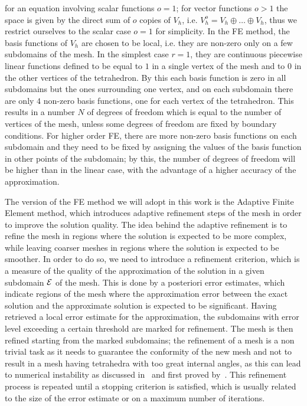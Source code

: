 for an equation involving scalar functions $o=1$; for vector functions $o>1$ the space is given by the direct sum of $o$ copies of $V_h$, i.e. $V_h^o = V_h \oplus \dots \oplus V_h$, thus we restrict ourselves to the scalar case $o=1$ for simplicity. \newline
In the FE method, the basis functions of $V_h$ are chosen to be local, i.e. they are non-zero only on a few subdomains of the mesh.
In the simplest case $r=1$, they are continuous piecewise linear functions defined to be equal to $1$ in a single vertex of the mesh and to $0$ in the other vertices of the tetrahedron. 
By this each basis function is zero in all subdomains but the ones surrounding one vertex, and on each subdomain there are only $4$ non-zero basis functions, one for each vertex of the tetrahedron.
This results in a number $N$ of degrees of freedom which is equal to the number of vertices of the mesh, unless some degrees of freedom are fixed by boundary conditions.
For higher order FE, there are more non-zero basis functions on each subdomain and they need to be fixed by assigning the values of the basis function in other points of the subdomain; by this, the number of degrees of freedom will be higher than in the linear case, with the advantage of a higher accuracy of the approximation. \medskip

The version of the FE method we will adopt in this work is the Adaptive Finite Element method, which introduces adaptive refinement steps of the mesh in order to improve the solution quality.
The idea behind the adaptive refinement is to refine the mesh in regions where the solution is expected to be more complex, while leaving coarser meshes in regions where the solution is expected to be smoother.
In order to do so, we need to introduce a refinement criterion, which is a measure of the quality of the approximation of the solution in a given subdomain $\mathcal E$ of the mesh.
This is done by a posteriori error estimates, which indicate regions of the mesh where the approximation error between the exact solution and the approximate solution is expected to be significant.
Having retrieved a local error estimate for the approximation, the subdomains with error level exceeding a certain threshold are marked for refinement.
The mesh is then refined starting from the marked subdomains; the refinement of a mesh is a non trivial task as it needs to guarantee the conformity of the new mesh and not to result in a mesh having tetrahedra with too great internal angles, as this can lead to numerical instability as discussed in~\cite[Section 4.4.3]{DeuflhardWeiser2012} and first proved by~\cite{SyngeRheinboldt1957}.
This refinement process is repeated until a stopping criterion is satisfied, which is usually related to the size of the error estimate or on a maximum number of iterations.\medskip

